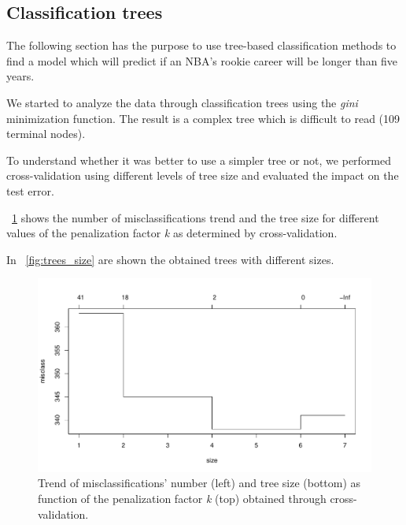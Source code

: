 \subsection{Classification trees}

The following section has the purpose to use tree-based classification methods to find a model which will predict if an NBA's rookie career will be longer than five years.

We started to analyze the data through classification trees using the \textit{gini} minimization function. The result is a complex tree which is difficult to read (109 terminal nodes).

To understand whether it was better to use a simpler tree or not, we performed cross-validation using different levels of tree size and evaluated the impact on the test error.

\Fig~\ref{fig:tree_cv_plot} shows the number of misclassifications trend and the tree size for different values of the penalization factor \textit{k} as determined by cross-validation. 

In \Fig~\ref{fig:trees_size} are shown the obtained trees with different sizes.

\begin{figure}[h]
	\centering
	\includegraphics[width=0.5\linewidth]{ImageFiles/Classification/Trees/tree_cv_plot.pdf}
	\caption{Trend of misclassifications' number (left) and tree size (bottom) as function of the penalization factor \textit{k} (top) obtained through cross-validation.}
	\label{fig:tree_cv_plot}
\end{figure}

